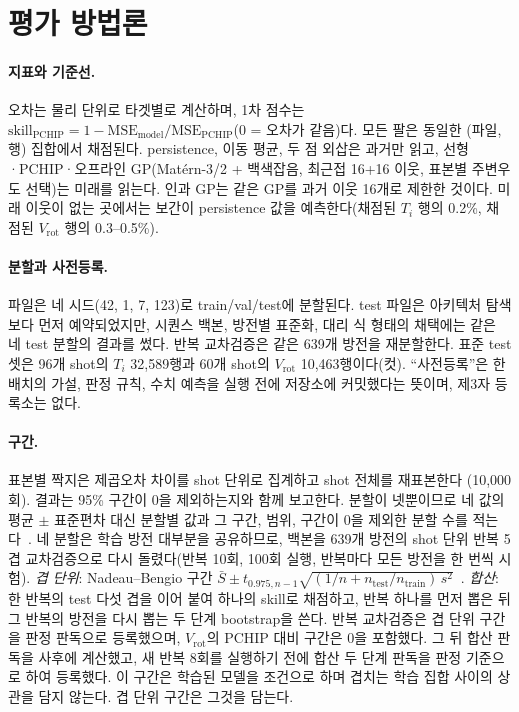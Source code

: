 \documentclass[10pt,twocolumn,letterpaper]{article}
\newcommand{\Ti}{\ensuremath{T_i}}
\newcommand{\Vrot}{\ensuremath{V_\mathrm{rot}}}
\newcommand{\skillp}{\ensuremath{\mathrm{skill}_{\mathrm{PCHIP}}}}
\begin{document}
\section{평가 방법론}
\label{sec:eval}

\paragraph{지표와 기준선.} 오차는 물리 단위로 타겟별로 계산하며, 1차 점수는
$\skillp = 1 - \mathrm{MSE}_{\mathrm{model}}/\mathrm{MSE}_{\mathrm{PCHIP}}$(0 = 오차가 같음)다.
모든 팔은 동일한 (파일, 행) 집합에서 채점된다. persistence, 이동 평균, 두 점 외삽은 과거만
읽고, 선형·PCHIP·오프라인 GP(Matérn-3/2 + 백색잡음, 최근접 16+16 이웃, 표본별 주변우도
선택)는 미래를 읽는다. 인과 GP는 같은 GP를 과거 이웃 16개로 제한한 것이다. 미래 이웃이 없는
곳에서는 보간이 persistence 값을 예측한다(채점된 \Ti{} 행의 0.2\%, 채점된 \Vrot{} 행의
0.3--0.5\%).

\paragraph{분할과 사전등록.} 파일은 네 시드(42, 1, 7, 123)로 train/val/test에 분할된다.
test 파일은 아키텍처 탐색보다 먼저 예약되었지만, 시퀀스 백본, 방전별 표준화, 대리 식 형태의
채택에는 같은 네 test 분할의 결과를 썼다. 반복 교차검증은 같은 639개 방전을 재분할한다. 표준
test 셋은 96개 shot의 \Ti{} 32{,}589행과 60개 shot의 \Vrot{} 10{,}463행이다(컷).
``사전등록''은 한 배치의 가설, 판정 규칙, 수치 예측을 실행 전에 저장소에 커밋했다는 뜻이며,
제3자 등록소는 없다.

\paragraph{구간.} 표본별 짝지은 제곱오차 차이를 shot 단위로 집계하고 shot 전체를 재표본한다
(10{,}000회). 결과는 95\% 구간이 0을 제외하는지와 함께 보고한다. 분할이 넷뿐이므로 네 값의
평균 $\pm$ 표준편차 대신 분할별 값과 그 구간, 범위, 구간이 0을 제외한 분할 수를
적는다~\citep{Weissgerber2015Beyond,Agarwal2021Deep}. 네 분할은 학습 방전 대부분을
공유하므로, 백본을 639개 방전의 shot 단위 반복 5겹 교차검증으로 다시 돌렸다(반복 10회,
100회 실행, 반복마다 모든 방전을 한 번씩 시험).
\emph{겹 단위}: Nadeau--Bengio 구간
$\bar S \pm t_{0.975,n-1}\sqrt{(1/n + n_{\mathrm{test}}/n_{\mathrm{train}})\,s^2}$~\citep{Nadeau2003Inference}.
\emph{합산}: 한 반복의 test 다섯 겹을 이어 붙여 하나의 skill로 채점하고, 반복 하나를 먼저
뽑은 뒤 그 반복의 방전을 다시 뽑는 두 단계 bootstrap을 쓴다. 반복 교차검증은 겹 단위 구간을
판정 판독으로 등록했으며, \Vrot{}의 PCHIP 대비 구간은 0을 포함했다. 그 뒤 합산 판독을 사후에
계산했고, 새 반복 8회를 실행하기 전에 합산 두 단계 판독을 판정 기준으로 하여 등록했다. 이
구간은 학습된 모델을 조건으로 하며 겹치는 학습 집합 사이의 상관을 담지 않는다. 겹 단위 구간은
그것을 담는다.
\end{document}
